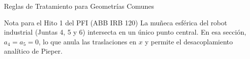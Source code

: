 \documentclass[aspectratio=169]{beamer}
\begin{document}
\begin{frame}{Reglas de Tratamiento para Geometrías Comunes}
    \vspace{-0.2cm}
    \begin{center}
        \renewcommand{\arraystretch}{1.2}
    \end{center}
    
    \vspace{-0.2cm}
    \begin{exampleblock}{Nota para el Hito 1 del PFI (ABB IRB 120)}
        \footnotesize La muñeca esférica del robot industrial (Juntas 4, 5 y 6) intersecta en un único punto central. En esa sección, $a_4 = a_5 = 0$, lo que anula las traslaciones en $x$ y permite el desacoplamiento analítico de Pieper.
    \end{exampleblock}
\end{frame}
\end{document}
